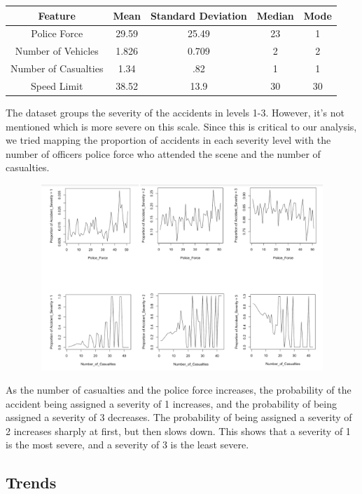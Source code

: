 \documentclass[a4paper, 10pt]{article}
\begin{document}
  \begin{center}
 \begin{tabular}{|c c c c c|} 
 \hline
 Feature & Mean & Standard Deviation & Median & Mode \\ 
 \hline\hline\hline
 Police Force & 29.59 & 25.49 & 23 & 1  \\ 
 \hline
 Number of Vehicles & 1.826 & 0.709 & 2 & 2 \\
 \hline
 Number of Casualties & 1.34 & .82 & 1 & 1 \\
 \hline
 Speed Limit & 38.52 & 13.9 & 30 & 30 \\
 \hline\hline
\end{tabular}
\end{center}


    The dataset groups the severity of the accidents in levels 1-3. However, it's not mentioned which is more severe on this scale. Since this is critical to our analysis, we tried mapping the proportion of accidents in each severity level with the number of officers police force who attended the scene and the number of casualties. \\

   \begin{center}
     \includegraphics[width=70cm,height=7cm, scale=0.6,keepaspectratio]{severity-analysis.png}
   \end{center}

As the number of casualties and the police force increases, the probability of the accident being assigned a severity of 1 increases, and the probability of being assigned a severity of 3 decreases. The probability of being assigned a severity of 2 increases sharply at first, but then slows down. This shows that a severity of 1 is the most severe, and a severity of 3 is the least severe. \\

 \subsection{Trends}
   
\end{document}
